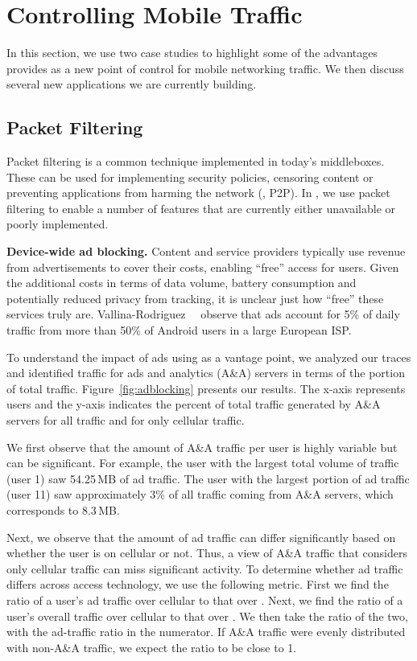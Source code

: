 \section{Controlling Mobile Traffic}
\label{sec:control}
In this section, we use two case studies to highlight some of the 
advantages \meddle provides as a new point of control 
for mobile networking traffic. We then discuss several new applications 
we are currently building.

\subsection{Packet Filtering}
Packet filtering is a common technique implemented in 
today's middleboxes. These can be used for implementing 
security policies, censoring content or preventing applications 
from harming the network (\eg, P2P). In \meddle, we use 
packet filtering to enable a number of features that are 
currently either unavailable or poorly implemented.

\noindent\textbf{Device-wide ad blocking.} Content and service providers 
typically use revenue from advertisements to cover their costs, enabling 
``free'' access for users. Given the additional costs in terms of data volume, 
battery consumption and potentially reduced privacy from tracking, it is unclear 
just how ``free'' these services truly are. Vallina-Rodriguez~\etal~\cite{Vallina-rodriguez:2012:AdCache} observe
that ads account for 5\% of daily traffic from more than 50\% of
Android users in a large European ISP. 

To understand the impact of ads using \meddle as a vantage point, we 
analyzed our traces and identified traffic for ads and analytics (A\&A) servers 
in terms of the portion of total traffic. Figure~\ref{fig:adblocking} presents our 
results. The x-axis represents users and the y-axis indicates the percent of 
total traffic generated by A\&A servers for all traffic and for only cellular traffic. 

We first observe that the amount of A\&A traffic per user is highly variable but can be 
significant. For example, the user with the largest total volume of traffic (user 1) saw 
54.25\,MB of ad traffic. The user with the largest portion of ad traffic (user 11) saw 
approximately 3\% of all traffic coming from A\&A servers, which corresponds to 8.3\,MB. 

Next, we observe that the amount of ad traffic can differ significantly 
based on whether the user is on cellular or not. Thus, a view of A\&A 
traffic that considers only cellular traffic can miss significant activity. 
To determine whether ad traffic differs across access technology, we use 
the following metric. First we find the ratio of a user's ad traffic over cellular 
to that over \wifi. Next, we find the ratio of a user's overall traffic over cellular 
to that over \wifi. We then take the ratio of the two, with the ad-traffic ratio 
in the numerator. If A\&A traffic were evenly distributed with non-A\&A traffic, 
we expect the ratio to be close to 1.

